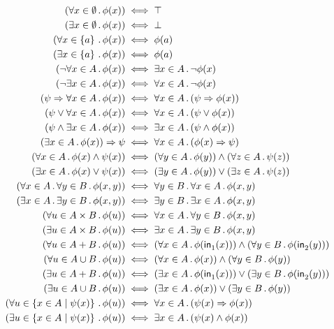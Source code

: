 \begin{table}[htp]
  \centering
  \small
  \begin{align*}
    (\all{x \in \emptyset} \phi(x))   &\iff   \top \\
    (\some{x \in \emptyset} \phi(x))   &\iff   \bot \\
    (\all{x \in \set{a}} \phi(x))   &\iff   \phi(a) \\
    (\some{x \in \set{a}} \phi(x))   &\iff   \phi(a) \\
    (\neg \all{x \in A} \phi(x))   &\iff   \some{x \in A} \neg \phi(x) \\
    (\neg \some{x \in A} \phi(x))   &\iff   \all{x \in A} \neg \phi(x) \\
    (\psi \lthen \all{x \in A} \phi(x))   &\iff   \all{x \in A} (\psi \lthen \phi(x)) \\
    (\psi \lor \all{x \in A} \phi(x))   &\iff   \all{x \in A} (\psi \lor \phi(x)) \\
    (\psi \land \some{x \in A} \phi(x))   &\iff   \some{x \in A} (\psi \land \phi(x)) \\
    (\some{x \in A} \phi(x)) \lthen \psi   &\iff   \all{x \in A} (\phi(x) \lthen \psi) \\
    (\all{x \in A} \phi(x) \land \psi(x))   &\iff   (\all{y \in A} \phi(y)) \land (\all{z \in A} \psi(z)) \\
    (\some{x \in A} \phi(x) \lor \psi(x))   &\iff   (\some{y \in A} \phi(y)) \lor (\some{z \in A} \psi(z)) \\
    (\all{x \in A} \all{y \in B} \phi(x, y))   &\iff   \all{y \in B} \all{x \in A} \phi(x, y) \\
    (\some{x \in A} \some{y \in B} \phi(x, y))   &\iff   \some{y \in B} \some{x \in A} \phi(x, y) \\
    (\all{u \in A \times B} \phi(u))   &\iff   \all{x \in A} \all{y \in B} \phi(x, y) \\
    (\some{u \in A \times B} \phi(u))   &\iff   \some{x \in A} \some{y \in B} \phi(x, y) \\
    (\all{u \in A + B} \phi(u))   &\iff   (\all{x \in A} \phi(\inl(x))) \land (\all{y \in B} \phi(\inr(y))) \\
    (\all{u \in A \cup B} \phi(u))   &\iff   (\all{x \in A} \phi(x)) \land (\all{y \in B} \phi(y)) \\
    (\some{u \in A + B} \phi(u))   &\iff   (\some{x \in A} \phi(\inl(x))) \lor (\some{y \in B} \phi(\inr(y))) \\
    (\some{u \in A \cup B} \phi(u))   &\iff   (\some{x \in A} \phi(x)) \lor (\some{y \in B} \phi(y)) \\
    (\all{u \in \set{x \in A \such \psi(x)}} \phi(u))   &\iff   \all{x \in A} (\psi(x) \lthen \phi(x)) \\
    (\some{u \in \set{x \in A \such \psi(x)}} \phi(u))   &\iff   \some{x \in A} (\psi(x) \land \phi(x))
  \end{align*}
  \caption{Pravila za kvantifikatorje. V pravilih, v katerih nastopa $\psi$ brez argumenta, spremenljivka $x$ v~$\psi$ ne nastopa.}
  \label{tabela:pravila-kvantifikatorji}
\end{table}


